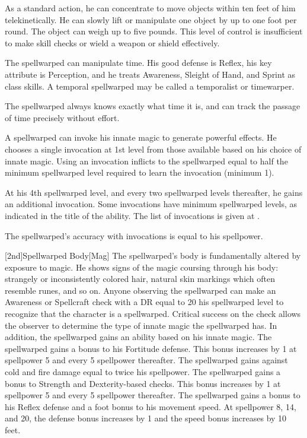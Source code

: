         As a standard action, he can concentrate to move objects within ten feet of him telekinetically.
        He can slowly lift or manipulate one object by up to one foot per round.
        The object can weigh up to five pounds.
        This level of control is insufficient to make skill checks or wield a weapon or shield effectively.

        The spellwarped can manipulate time.
        His good defense is Reflex, his key attribute is Perception, and he treats Awareness, Sleight of Hand, and Sprint as class skills.
        A temporal spellwarped may be called a temporalist or timewarper.

        The spellwarped always knows exactly what time it is, and can track the passage of time precisely without effort.

        A spellwarped can invoke his innate magic to generate powerful effects.
        He chooses a single invocation at 1st level from those available based on his choice of innate magic.
        Using an invocation inflicts  to the spellwarped equal to half the minimum spellwarped level required to learn the invocation (minimum 1).

        At his 4th spellwarped level, and every two spellwarped levels thereafter, he gains an additional invocation.
        Some invocations have minimum spellwarped levels, as indicated in the title of the ability.
        The list of invocations is given at .

        The spellwarped's accuracy with invocations is equal to his spellpower.

        [2nd]{Spellwarped Body}[Mag]
        The spellwarped's body is fundamentally altered by exposure to magic.
        He shows signs of the magic coursing through his body: strangely or inconsistently colored hair, natural skin markings which often resemble runes, and so on.
        Anyone observing the spellwarped can make an Awareness or Spellcraft check with a DR equal to 20 \sub his spellwarped level to recognize that the character is a spellwarped.
        Critical success on the check allows the observer to determine the type of innate magic the spellwarped has.
        In addition, the spellwarped gains an ability based on his innate magic.
        The spellwarped gains a  bonus to his Fortitude defense.
        This bonus increases by 1 at spellpower 5 and every 5 spellpower thereafter.
        The spellwarped gains  against cold and fire damage equal to twice his spellpower.
        The spellwarped gains a  bonus to Strength and Dexterity-based checks.
        This bonus increases by 1 at spellpower 5 and every 5 spellpower thereafter.
        The spellwarped gains a  bonus to his Reflex defense and a  foot bonus to his movement speed.
        At spellpower 8, 14, and 20, the defense bonus increases by 1 and the speed bonus increases by 10 feet.

